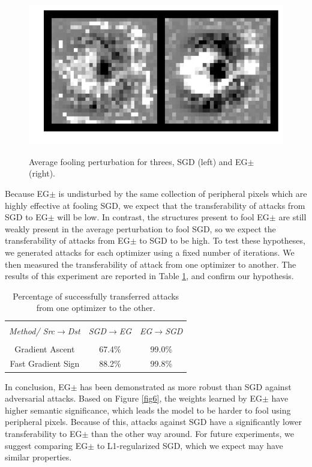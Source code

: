 \documentclass{asaproc}
\begin{document}
\begin{figure}
	\centering
	\caption{\enspace Average fooling perturbation for threes, SGD (left) and EG$\pm$ (right).}
	\includegraphics[width=\linewidth]{avg_attack_3.png}
	\label{fig7}
\end{figure}

Because EG$\pm$ is undisturbed by the same collection of peripheral pixels which are highly effective at fooling SGD, we expect that the transferability of attacks from SGD to EG$\pm$ will be low. In contrast, the structures present to fool EG$\pm$ are still weakly present in the average perturbation to fool SGD, so we expect the transferability of attacks from EG$\pm$ to SGD to be high. To test these hypotheses, we generated attacks for each optimizer using a fixed number of iterations. We then measured the transferability of attack from one optimizer to another. The results of this experiment are reported in Table \ref{tab3}, and confirm our hypothesis.

\begin{table}
	\caption{\enspace Percentage of successfully transferred attacks from one optimizer to the other.}
	\label{tab3}
	\begin{tabular*}{\hsize}{@{\extracolsep{\fill}}ccc}
		\hline
		\\[-7pt]
		\multicolumn{1}{c}{\it Method/ Src$\to$Dst} & 
		\multicolumn{1}{c}{\it SGD$\to$EG}          & 
		\multicolumn{1}{c}{\it EG$\to$SGD}          \\ 
		\hline
		\\[-5pt] 
		Gradient Ascent     & 67.4\% & 99.0\% \\
		Fast Gradient Sign  & 88.2\% & 99.8\%
	\end{tabular*}
\end{table}

In conclusion, EG$\pm$ has been demonstrated as more robust than SGD against adversarial attacks. Based on Figure \ref{fig6}, the weights learned by EG$\pm$ have higher semantic significance, which leads the model to be harder to fool using peripheral pixels. Because of this, attacks against SGD have a significantly lower transferability to EG$\pm$ than the other way around. For future experiments, we suggest comparing EG$\pm$ to L1-regularized SGD, which we expect may have similar properties.
\end{document}

